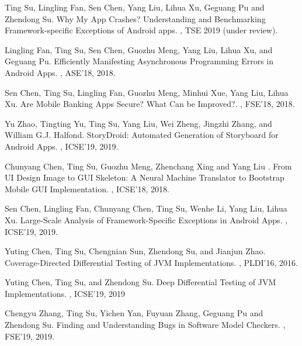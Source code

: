 \documentclass[a4paper]{article}
\begin{document}
\begin{thebibliography}{99}
	\newblock Ting Su, Lingling Fan, Sen Chen, Yang Liu, Lihua Xu, Geguang Pu and Zhendong Su.
	\newblock Why My App Crashes? Understanding and Benchmarking
	Framework-specific Exceptions of Android apps. 
	, TSE 2019 (under review).
	
	\newblock Lingling Fan, Ting Su, Sen Chen, Guozhu Meng, Yang Liu, Lihua Xu, and Geguang Pu.
	\newblock Efficiently Manifesting Asynchronous Programming Errors in Android Apps.
	, ASE'18, 2018.
	
	\newblock Sen Chen, Ting Su, Lingling Fan, Guozhu Meng, Minhui Xue, Yang Liu, Lihua Xu.
	\newblock Are Mobile Banking Apps Secure? What Can be Improved?.
	, FSE'18, 2018.
	
	\newblock Yu Zhao, Tingting Yu, Ting Su, Yang Liu, Wei Zheng, Jingzhi Zhang, and William G.J. Halfond.
	\newblock StoryDroid: Automated Generation of Storyboard for Android Apps.
	, ICSE'19, 2019.
	
	\newblock Chunyang Chen, Ting Su, Guozhu Meng, Zhenchang Xing and Yang Liu .
	\newblock From UI Design Image to GUI Skeleton: A Neural Machine Translator to Bootstrap Mobile GUI Implementation.
	, ICSE'18, 2018.
	
	\newblock Sen Chen, Lingling Fan, Chunyang Chen, Ting Su, Wenhe Li, Yang Liu, Lihua Xu.
	\newblock Large-Scale Analysis of Framework-Specific Exceptions in Android Apps.
	, ICSE'19, 2019.
	
	\newblock Yuting Chen, Ting Su, Chengnian Sun, Zhendong Su, and Jianjun Zhao.  
	\newblock Coverage-Directed Differential Testing of JVM Implementations.
	, PLDI'16, 2016.
	
	\newblock Yuting Chen, Ting Su, and Zhendong Su.
	\newblock Deep Differential Testing of JVM Implementations.
	, ICSE'19, 2019
	
	\newblock Chengyu Zhang, Ting Su, Yichen Yan, Fuyuan Zhang, Geguang Pu and Zhendong Su.  
	\newblock Finding and Understanding Bugs in Software Model Checkers.  
	, FSE'19, 2019. 
	

	
\end{thebibliography}
\end{document}
